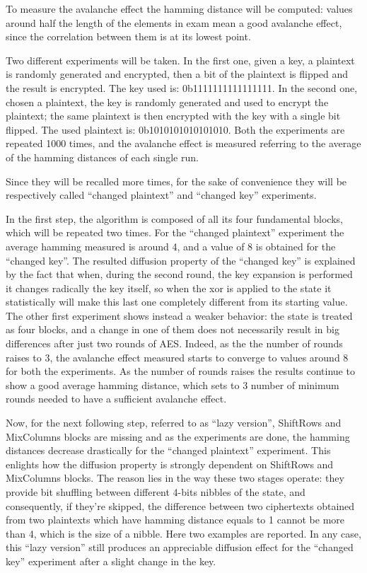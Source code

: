 \documentclass[12pt]{article}
\begin{document}
To measure the avalanche effect the hamming distance will be computed: values around half the length of the elements in exam mean a good avalanche effect, since the correlation between them is at its lowest point.

Two different experiments will be taken.
In the first one, given a key, a plaintext is randomly generated and encrypted, then a bit of the plaintext is flipped and the result is encrypted. The key used is: {\color{blue}0b1111111111111111}.
In the second one, chosen a plaintext, the key is randomly generated and used to encrypt the plaintext; the same plaintext is then encrypted with the key with a single bit flipped. The used plaintext is: {\color{blue}0b1010101010101010}.
Both the experiments are repeated 1000 times, and the avalanche effect is measured referring to the average of the hamming distances of each single run.

Since they will be recalled more times, for the sake of convenience they will be respectively called ``changed plaintext'' and ``changed key'' experiments.

In the first step, the algorithm is composed of all its four fundamental blocks, which will be repeated two times. For the ``changed plaintext'' experiment the average hamming measured is around {\color{blue}4}, and a value of {\color{blue}8} is obtained for the ``changed key''.
The resulted diffusion property of the ``changed key'' is explained by the fact that when, during the second round, the key expansion is performed it changes radically the key itself, so when the xor is applied to the state it statistically will make this last one completely different from its starting value.
The other first experiment shows instead a weaker behavior: the state is treated as four blocks, and a change in one of them does not necessarily result in big differences after just two rounds of AES\@. Indeed, as the the number of rounds raises to 3, the avalanche effect measured starts to converge to values around {\color{blue}8} for both the experiments.
As the number of rounds raises the results continue to show a good average hamming distance, which sets to 3 number of minimum rounds needed to have a sufficient avalanche effect.

Now, for the next following step, referred to as ``lazy version'', ShiftRows and MixColumns blocks are missing and as the experiments are done, the hamming distances decrease drastically for the ``changed plaintext'' experiment. This enlights how the diffusion property is strongly dependent on ShiftRows and MixColumns blocks. The reason lies in the way these two stages operate: they provide bit shuffling between different 4-bits nibbles of the state, and consequently, if they're skipped, the difference between two ciphertexts obtained from two plaintexts which have hamming distance equals to {\color{blue}1} cannot be more than 4, which is the size of a nibble.
Here two examples are reported.
In any case, this ``lazy version'' still produces an appreciable diffusion effect for the ``changed key'' experiment after a slight change in the key.
\end{document}
